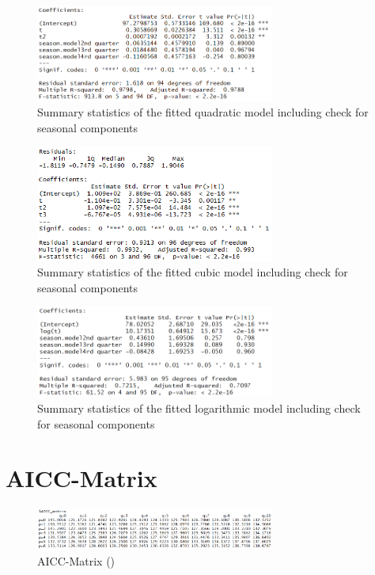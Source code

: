 \documentclass[11pt,a4paper]{article}
\begin{document}
\begin{figure} 
    \centering
    \includegraphics[width=0.7\textwidth]{summary_quadraticmodel}
    \caption{Summary statistics of the fitted quadratic model including check for seasonal components}
    \label{fig:summary_quadraticmodel}
\end{figure}

\begin{figure} 
    \centering
    \includegraphics[width=0.7\textwidth]{summary_cubicmodel}
    \caption{Summary statistics of the fitted cubic model including check for seasonal components}
    \label{fig:summary_cubicmodel}
\end{figure}

\begin{figure} 
    \centering
    \includegraphics[width=0.7\textwidth]{summary_logmodel}
    \caption{Summary statistics of the fitted logarithmic model including check for seasonal components}
    \label{fig:summary_logmodel}
\end{figure}


\section{AICC-Matrix}
\label{sec:aicc_matrix}
\begin{figure} 
    \centering
    \includegraphics[width=0.7\textwidth]{aicc_matrix}
    \caption{AICC-Matrix (\citep{aic86})}
    \label{fig:aicc_matrix}
\end{figure}
\end{document}
